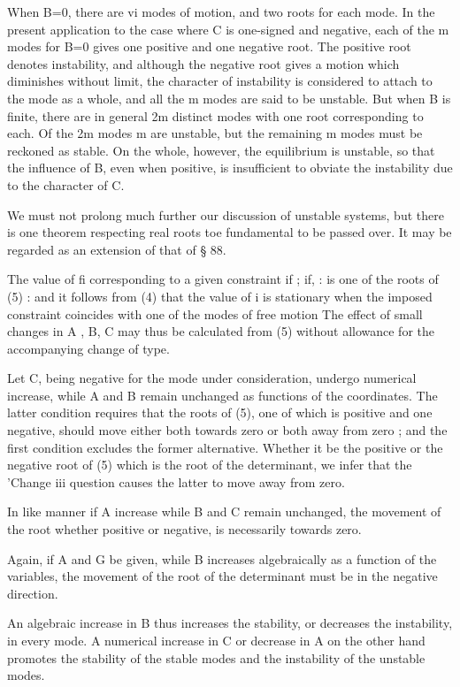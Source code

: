 When B=0, there are vi modes of motion, and two roots for
each mode. In the present application to the case where C is
one-signed and negative, each of the m modes for B=0 gives
one positive and one negative root. The positive root denotes
instability, and although the negative root gives a motion which
diminishes without limit, the character of instability is considered
to attach to the mode as a whole, and all the m modes are said
to be unstable. But when B is finite, there are in general 2m
distinct modes with one root corresponding to each. Of the
2m modes m are unstable, but the remaining m modes must be
reckoned as stable. On the whole, however, the equilibrium is
unstable, so that the influence of B, even when positive, is insufficient to obviate the instability due to the character of C.

We must not prolong much further our discussion of unstable
systems, but there is one theorem respecting real roots toe
fundamental to be passed over. It may be regarded as an extension of that of § 88.

The value of fi corresponding to a given constraint if ; if, :
is one of the roots of (5) : and it follows from (4) that the value of
 i is stationary when the imposed constraint coincides with one of
the modes of free motion The effect of small changes in A , B, C
may thus be calculated from (5) without allowance for the
accompanying change of type.


Let C, being negative for the mode under consideration,
undergo numerical increase, while A and B remain unchanged as
functions of the coordinates. The latter condition requires that
the roots of (5), one of which is positive and one negative, should
move either both towards zero or both away from zero ; and the
first condition excludes the former alternative. Whether it be
the positive or the negative root of (5) which is the root of the
determinant, we infer that the 'Change iii question causes the
latter to move away from zero.

In like manner if A increase while B and C remain unchanged,
the movement of the root whether positive or negative, is
necessarily towards zero.

Again, if A and G be given, while B increases algebraically
as a function of the variables, the movement of the root of the
determinant must be in the negative direction.

An algebraic increase in B thus increases the stability, or
decreases the instability, in every mode. A numerical increase
in C or decrease in A on the other hand promotes the stability
of the stable modes and the instability of the unstable modes.


